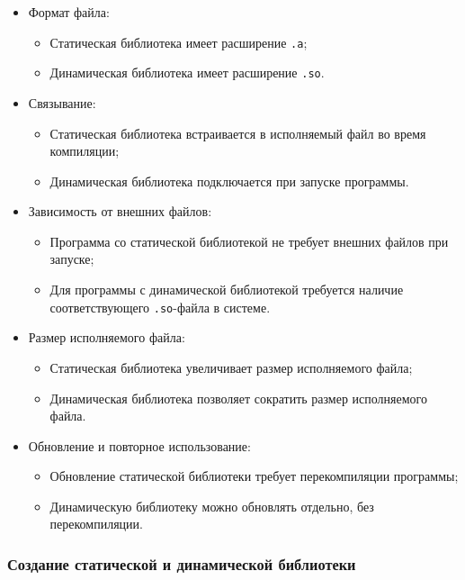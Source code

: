 \begin{itemize}
  \item Формат файла:
  \begin{itemize}
    \item Статическая библиотека имеет расширение \texttt{.a};
    \item Динамическая библиотека имеет расширение \texttt{.so}.
  \end{itemize}
  
  \item Связывание:
  \begin{itemize}
    \item Статическая библиотека встраивается в исполняемый файл во время компиляции;
    \item Динамическая библиотека подключается при запуске программы.
  \end{itemize}
  
  \item Зависимость от внешних файлов:
  \begin{itemize}
    \item Программа со статической библиотекой не требует внешних файлов при запуске;
    \item Для программы с динамической библиотекой требуется наличие соответствующего \texttt{.so}-файла в системе.
  \end{itemize}
  
  \item Размер исполняемого файла:
  \begin{itemize}
    \item Статическая библиотека увеличивает размер исполняемого файла;
    \item Динамическая библиотека позволяет сократить размер исполняемого файла.
  \end{itemize}
  
  \item Обновление и повторное использование:
  \begin{itemize}
    \item Обновление статической библиотеки требует перекомпиляции программы;
    \item Динамическую библиотеку можно обновлять отдельно, без перекомпиляции.
  \end{itemize}
\end{itemize}

\subsubsection*{Создание статической и динамической библиотеки}

